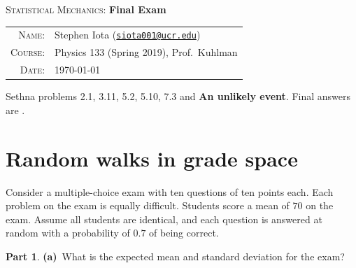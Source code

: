 \documentclass[11pt]{article}
\newcommand{\email}[1]{\texttt{\href{mailto:#1}{#1}}}
\theoremstyle{definition}
\newtheorem{question}{Part}[section]
\numberwithin{equation}{section}
\numberwithin{figure}{section}
\begin{document}
\begin{center}
{\LARGE \textsc{Statistical Mechanics}: \textbf{Final Exam}}
\end{center}
\bigbreak

\begin{tabular}{rl}
\textsc{Name}:&		Stephen Iota (\email{siota001@ucr.edu})
\\
\textsc{Course}:&		Physics 133 (Spring 2019), Prof.~Kuhlman
\\
\textsc{Date}:&		\today
\end{tabular}
\bigbreak




\noindent
Sethna problems 2.1, 3.11, 5.2, 5.10, 7.3 and \textbf{An unlikely event}. Final answers are .





\section{Random walks in grade space}
Consider a multiple-choice exam with ten questions of ten points each. Each problem on the exam is equally difficult. Students score a mean of $70$ on the exam. Assume all students are identical, and each question is answered at random with a probability of $0.7$ of being correct.

\begin{question}
\textbf{(a)}~What is the expected mean and standard deviation for the exam?
\end{question}
\end{document}
